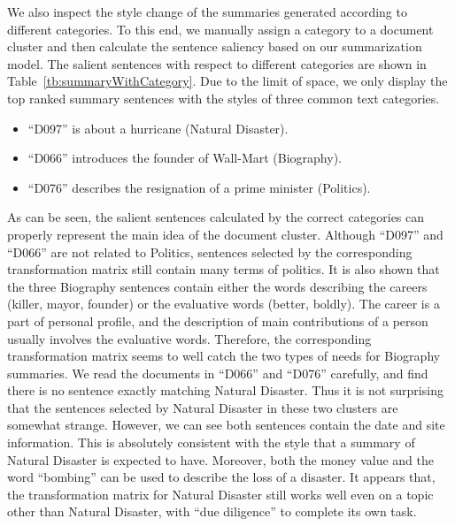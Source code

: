 \documentclass[letterpaper]{article}
\begin{document}
We also inspect the style change of the summaries generated according to different categories.
To this end, we manually assign a category to a document cluster and then calculate the sentence saliency based on our summarization model.
The salient sentences with respect to different categories are shown in Table~\ref{tb:summaryWithCategory}.
Due to the limit of space, we only display the top ranked summary sentences with the styles of three common text categories.
\begin{itemize}
\item ``D097'' is about a hurricane (Natural Disaster).
\item ``D066'' introduces the founder of Wall-Mart (Biography).
\item ``D076'' describes the resignation of a prime minister (Politics).
\end{itemize}
As can be seen, the salient sentences calculated by the correct categories can properly represent the main idea of the document cluster.
Although ``D097'' and ``D066'' are not related to Politics, sentences selected by the corresponding transformation matrix still contain many terms of politics.
It is also shown that the three Biography sentences contain either the words describing the careers (killer, mayor, founder) or the evaluative words (better, boldly).
The career is a part of personal profile, and the description of main contributions of a person usually involves the evaluative words.
Therefore, the corresponding transformation matrix seems to well catch the two types of needs for Biography summaries.
We read the documents in ``D066'' and ``D076'' carefully, and find there is no sentence exactly matching Natural Disaster.
Thus it is not surprising that the sentences selected by Natural Disaster in these two clusters are somewhat strange.
However, we can see both sentences contain the date and site information.
This is absolutely consistent with the style that a summary of Natural Disaster is expected to have.
Moreover, both the money value and the word ``bombing'' can be used to describe the loss of a disaster.
It appears that, the transformation matrix for Natural Disaster still works well even on a topic other than Natural Disaster, with ``due diligence'' to complete its own task.
\end{document}
